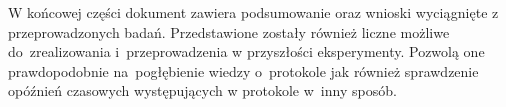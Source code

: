 W końcowej części dokument zawiera podsumowanie oraz wnioski wyciągnięte z przeprowadzonych badań. Przedstawione zostały również liczne możliwe do~zrealizowania i~przeprowadzenia w przyszłości eksperymenty. Pozwolą one prawdopodobnie na~pogłębienie wiedzy o~protokole jak również sprawdzenie opóźnień czasowych występujących w protokole w~inny sposób.
\clearpage